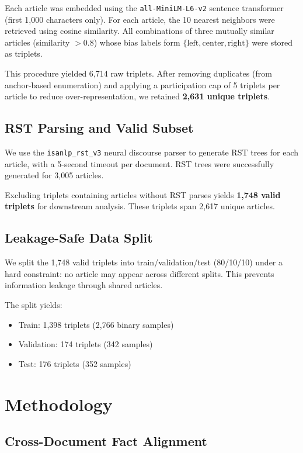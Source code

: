 \documentclass[11pt]{article}
\begin{document}
Each article was embedded using the \texttt{all-MiniLM-L6-v2} sentence transformer (first 1,000 characters only). For each article, the 10 nearest neighbors were retrieved using cosine similarity. All combinations of three mutually similar articles (similarity $> 0.8$) whose bias labels form $\{\text{left}, \text{center}, \text{right}\}$ were stored as triplets.

This procedure yielded 6,714 raw triplets. After removing duplicates (from anchor-based enumeration) and applying a participation cap of 5 triplets per article to reduce over-representation, we retained \textbf{2,631 unique triplets}.

\subsection{RST Parsing and Valid Subset}

We use the \texttt{isanlp\_rst\_v3} neural discourse parser to generate RST trees for each article, with a 5-second timeout per document. RST trees were successfully generated for 3,005 articles.

Excluding triplets containing articles without RST parses yields \textbf{1,748 valid triplets} for downstream analysis. These triplets span 2,617 unique articles.

\subsection{Leakage-Safe Data Split}

We split the 1,748 valid triplets into train/validation/test (80/10/10) under a hard constraint: no article may appear across different splits. This prevents information leakage through shared articles.

The split yields:
\begin{itemize}
    \item Train: 1,398 triplets (2,766 binary samples)
    \item Validation: 174 triplets (342 samples)
    \item Test: 176 triplets (352 samples)
\end{itemize}


\section{Methodology}

\subsection{Cross-Document Fact Alignment}
\end{document}
